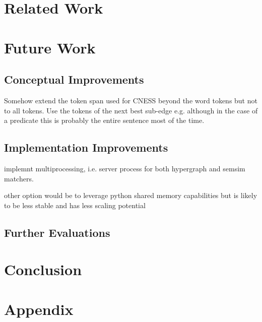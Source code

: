 \documentclass[11pt]{scrreprt}
\begin{document}



\chapter{Related Work}




\chapter{Future Work}
\section{Conceptual Improvements}
Somehow extend the token span used for CNESS beyond the word tokens but not to all tokens. Use the tokens of the next best sub-edge e.g. although in the case of a predicate this is probably the entire sentence most of the time.

\section{Implementation Improvements}
implemnt multiprocessing, i.e. server process for both hypergraph and semsim matchers. 

other option would be to leverage python shared memory capabilities but is likely to be less stable and has less scaling potential

\section{Further Evaluations}


\chapter{Conclusion}




\printbibliography
\appendix
\chapter{Appendix}

\end{document}
